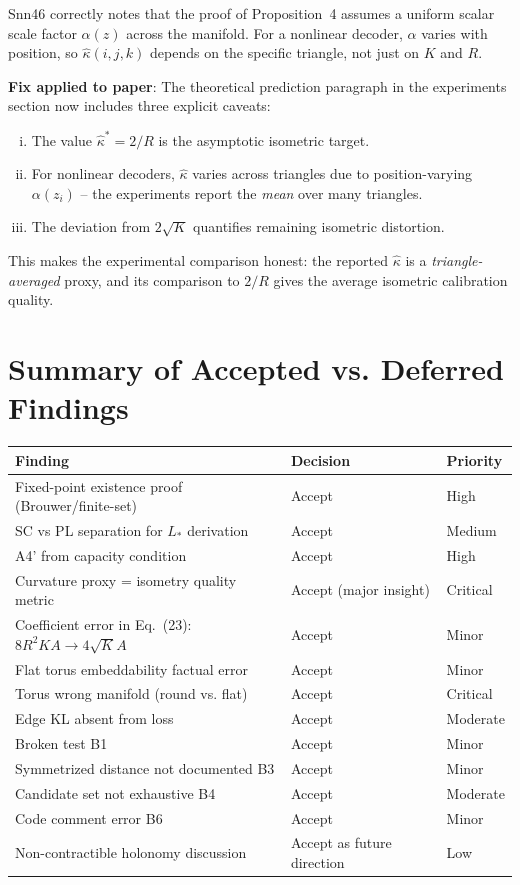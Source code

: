 \documentclass{article}
\begin{document}
Snn46 correctly notes that the proof of Proposition~4 assumes a uniform scalar
scale factor $\alpha(z)$ across the manifold. For a nonlinear decoder, $\alpha$
varies with position, so $\hat{\kappa}(i,j,k)$ depends on the specific triangle,
not just on $K$ and $R$.

\textbf{Fix applied to paper}: The theoretical prediction paragraph in the
experiments section now includes three explicit caveats:
\begin{enumerate}[(i)]
  \item The value $\hat{\kappa}^* = 2/R$ is the asymptotic isometric target.
  \item For nonlinear decoders, $\hat{\kappa}$ varies across triangles due to
    position-varying $\alpha(z_i)$ -- the experiments report the \emph{mean}
    over many triangles.
  \item The deviation from $2\sqrt{K}$ quantifies remaining isometric distortion.
\end{enumerate}
This makes the experimental comparison honest: the reported $\hat{\kappa}$ is
a \emph{triangle-averaged} proxy, and its comparison to $2/R$ gives the
average isometric calibration quality.

\section{Summary of Accepted vs. Deferred Findings}

\begin{tabular}{lll}
\hline
Finding & Decision & Priority \\
\hline
Fixed-point existence proof (Brouwer/finite-set) & Accept & High \\
SC vs PL separation for $L_*$ derivation & Accept & Medium \\
A4' from capacity condition & Accept & High \\
Curvature proxy = isometry quality metric & Accept (major insight) & Critical \\
Coefficient error in Eq.~(23): $8R^2KA \to 4\sqrt{K}A$ & Accept & Minor \\
Flat torus embeddability factual error & Accept & Minor \\
Torus wrong manifold (round vs. flat) & Accept & Critical \\
Edge KL absent from loss & Accept & Moderate \\
Broken test B1 & Accept & Minor \\
Symmetrized distance not documented B3 & Accept & Minor \\
Candidate set not exhaustive B4 & Accept & Moderate \\
Code comment error B6 & Accept & Minor \\
Non-contractible holonomy discussion & Accept as future direction & Low \\
\hline
\end{tabular}
\end{document}
